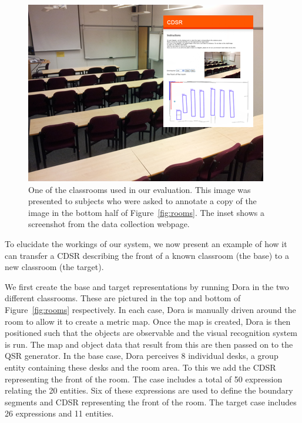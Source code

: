 \documentclass[letterpaper]{article}
\begin{document}
\begin{figure}
  \includegraphics[width=\columnwidth]{images/ug40.png}
  \caption{One of the classrooms used in our evaluation. This image was presented to subjects who were asked to annotate a copy of the image in the bottom half of Figure~\ref{fig:rooms}. The inset shows a screenshot from the data collection webpage.}
  \label{fig:ug40}
\end{figure}



To elucidate the workings of our system, we now present an example of how it can transfer a CDSR describing the front of a known classroom (the base) to a new classroom (the target). 

We first create the base and target representations by running Dora in the two different classrooms. These are pictured in the top and bottom of Figure~\ref{fig:rooms} respectively. In each case, Dora is manually driven around the room to allow it to create a metric map. Once the map is created, Dora is then positioned such that the objects are observable and the visual recognition system is run. The map and object data that result from this are then passed on to the QSR generator. In the base case, Dora perceives 8 individual desks, a group entity containing these desks and the room area. To this we add the CDSR representing the front of the room. The case includes a total of 50 expression relating the 20 entities. Six of these expressions are used to define the boundary segments and CDSR representing the front of the room. The target case includes 26 expressions and 11 entities.
\end{document}
